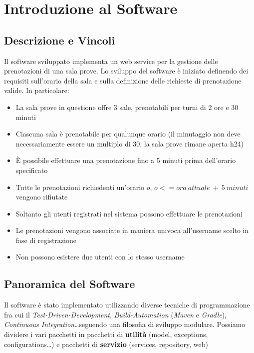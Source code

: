 \chapter{Introduzione al Software}

\section{Descrizione e Vincoli}

Il software sviluppato implementa un web service per la gestione delle prenotazioni di una sala prove.\newline
Lo sviluppo del software è iniziato definendo dei requisiti sull'orario della sala e sulla definizione delle richieste di prenotazione valide. In particolare:

\begin{itemize}
	\item La sala prove in questione offre 3 sale, prenotabili per turni di 2 ore e 30 minuti
	\item Ciascuna sala è prenotabile per qualunque orario (il minutaggio non deve necessariamente essere un multiplo di 30, la sala prove rimane aperta h24)
	\item È possibile effettuare una prenotazione fino a 5 minuti prima dell'orario specificato
	\item Tutte le prenotazioni richiedenti un'orario $o$, $o <= ora\ attuale\ +\ 5\ minuti$ vengono rifiutate
	\item Soltanto gli utenti registrati nel sistema possono effettuare le prenotazioni
	\item Le prenotazioni vengono associate in maniera univoca all'username scelto in fase di registrazione
	\item Non possono esistere due utenti con lo stesso username
\end{itemize}

\section{Panoramica del Software}

Il software è stato implementato utilizzando diverse tecniche di programmazione fra cui il \textsl{Test-Driven-Development}, \textsl{Build-Automation} (\textsl{Maven} e \textsl{Gradle}), \textsl{Continuous Integration}\dots seguendo una filosofia di sviluppo modulare. Possiamo dividere i vari pacchetti in pacchetti di \textbf{utilità} (model, exceptions, configurations\dots) e pacchetti di \textbf{servizio} (services, repository, web)

